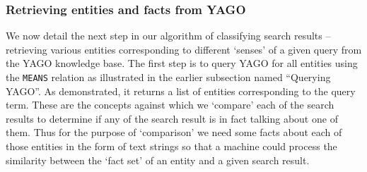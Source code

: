 \documentclass[a4paper,12pt]{report}
\begin{document}
\subsubsection{Retrieving entities and facts from YAGO}

We now detail the next step in our algorithm of classifying search
results -- retrieving various entities corresponding to different
`senses' of a given query from the YAGO knowledge base. The first step
is to query YAGO for all entities using the {\tt MEANS} relation as
illustrated in the earlier subsection named ``Querying YAGO''. As
demonstrated, it returns a list of entities corresponding to the query
term. These are the concepts against which we `compare' each of the
search results to determine if any of the search result is in fact
talking about one of them. Thus for the purpose of `comparison' we
need some facts about each of those entities in the form of text
strings so that a machine could process the similarity between the
`fact set' of an entity and a given search result.
\end{document}
